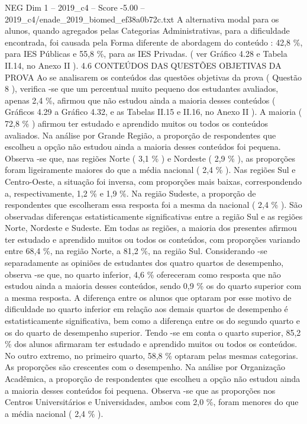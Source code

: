 \begin{textsample}{NEG Dim 1 – 2019\_c4 – Score -5.00 – 2019\_c4/enade\_2019\_biomed\_ef38a0b72c.txt}
A alternativa modal para os alunos, quando agregados pelas Categorias Administrativas, para a dificuldade encontrada, foi causada pela Forma diferente de abordagem do conteúdo : 42,8 \%, para IES Públicas e 55,8 \%, para as IES Privadas. ( ver Gráfico 4.28 e Tabela II.14, no Anexo II ). 4.6 CONTEÚDOS DAS QUESTÕES OBJETIVAS DA PROVA Ao se analisarem os conteúdos das questões objetivas da prova ( Questão 8 ), verifica -se que um percentual muito pequeno dos estudantes avaliados, apenas 2,4 \%, afirmou que não estudou ainda a maioria desses conteúdos ( Gráficos 4.29 a Gráfico 4.32, e as Tabelas II.15 e II.16, no Anexo II ).
A maioria ( 72,8 \% ) afirmou ter estudado e aprendido muitos ou todos os conteúdos avaliados.
Na análise por Grande Região, a proporção de respondentes que escolheu a opção não estudou ainda a maioria desses conteúdos foi pequena.
Observa -se que, nas regiões Norte ( 3,1 \% ) e Nordeste ( 2,9 \% ), as proporções foram ligeiramente maiores do que a média nacional ( 2,4 \% ).
Nas regiões Sul e Centro-Oeste, a situação foi inversa, com proporções mais baixas, correspondendo a, respectivamente, 1,2 \% e 1,9 \%.
Na região Sudeste, a proporção de respondentes que escolheram essa resposta foi a mesma da nacional ( 2,4 \% ).
São observadas diferenças estatisticamente significativas entre a região Sul e as regiões Norte, Nordeste e Sudeste.
Em todas as regiões, a maioria dos presentes afirmou ter estudado e aprendido muitos ou todos os conteúdos, com proporções variando entre 68,4 \%, na região Norte, a 81,2 \%, na região Sul.
Considerando -se separadamente as opiniões de estudantes dos quatro quartos de desempenho, observa -se que, no quarto inferior, 4,6 \% ofereceram como resposta que não estudou ainda a maioria desses conteúdos, sendo 0,9 \% os do quarto superior com a mesma resposta.
A diferença entre os alunos que optaram por esse motivo de dificuldade no quarto inferior em relação aos demais quartos de desempenho é estatisticamente significativa, bem como a diferença entre os do segundo quarto e os do quarto de desempenho superior.
Tendo -se em conta o quarto superior, 85,2 \% dos alunos afirmaram ter estudado e aprendido muitos ou todos os conteúdos.
No outro extremo, no primeiro quarto, 58,8 \% optaram pelas mesmas categorias.
As proporções são crescentes com o desempenho.
Na análise por Organização Acadêmica, a proporção de respondentes que escolheu a opção não estudou ainda a maioria desses conteúdos foi pequena.
Observa -se que as proporções nos Centros Universitários e Universidades, ambos com 2,0 \%, foram menores do que a média nacional ( 2,4 \% ).

\end{textsample}

